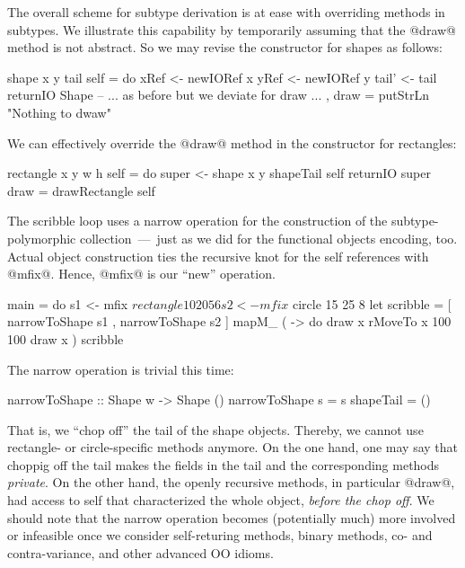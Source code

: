 \documentclass{jfp}
\begin{document}
The overall scheme for subtype derivation is at ease with
overriding methods in subtypes. We illustrate this capability by
temporarily assuming that the @draw@ method is not abstract. So we may
revise the constructor for shapes as follows:

\begin{code}
 shape x y tail self
   = do
        xRef  <- newIORef x
        yRef  <- newIORef y
        tail' <- tail
        returnIO Shape
                  { -- ... as before but we deviate for draw ...
                  , draw = putStrLn "Nothing to dwaw"
                  }
\end{code}

We can effectively override the @draw@ method in the constructor for
rectangles:

\begin{code}
 rectangle x y w h self
   = do 
        super <- shape x y shapeTail self
        returnIO super { draw = drawRectangle self }
\end{code}

The scribble loop uses a narrow operation for the construction of the
subtype-polymorphic collection~---~just as we did for the functional
objects encoding, too. Actual object construction ties the recursive
knot for the self references with @mfix@. Hence, @mfix@ is our ``new''
operation.

\begin{code}
main =
      do
         s1 <- mfix $ rectangle 10 20 5 6
         s2 <- mfix $ circle 15 25 8
         let scribble = [ narrowToShape s1
                        , narrowToShape s2
                        ]
         mapM_ ( \x -> 
                   do
                      draw x
                      rMoveTo x 100 100
                      draw x )
               scribble
\end{code}


The narrow operation is trivial this time:

\begin{code}
 narrowToShape :: Shape w -> Shape ()
 narrowToShape s = s { shapeTail = () } 
\end{code}

That is, we ``chop off'' the tail of the shape objects. Thereby, we
cannot use rectangle- or circle-specific methods anymore. On the one
hand, one may say that choppig off the tail makes the fields in the
tail and the corresponding methods \emph{private}. On the other hand,
the openly recursive methods, in particular @draw@, had access to self
that characterized the whole object, \emph{before the chop off}. We
should note that the narrow operation becomes (potentially much) more
involved or infeasible once we consider self-returing methods, binary
methods, co- and contra-variance, and other advanced OO idioms.
\end{document}
